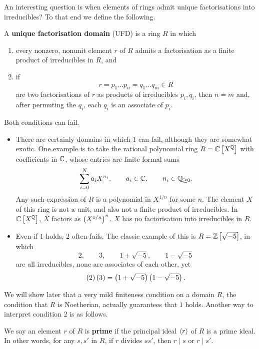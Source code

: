 An interesting question is when elements of rings admit unique factorisations into irreducibles? To that end we define the following.

\begin{definition}
A \textbf{unique factorisation domain} (UFD) is a ring $ R $ in which
\begin{enumerate}
\item every nonzero, nonunit element $ r $ of $ R $ admits a factorisation as a finite product of irreducibles in $ R $, and
\item if
$$ r = p_1 \dots p_n = q_1 \dots q_m \in R $$
are two factorisations of $ r $ as products of irreducibles $ p_i, q_i $, then $ n = m $ and, after permuting the $ q_i $, each $ q_i $ is an associate of $ p_i $.
\end{enumerate}
\end{definition}

Both conditions can fail.

\begin{example*}
\hfill
\begin{itemize}
\item There are certainly domains in which $ 1 $ can fail, although they are somewhat exotic. One example is to take the rational polynomial ring $ R = \mathbb{C}\left[ X^{\mathbb{Q}} \right] $ with coefficients in $ \mathbb{C} $, whose entries are finite formal sums
$$ \sum_{i = 0}^N a_iX^{n_i}, \qquad a_i \in \mathbb{C}, \qquad n_i \in \mathbb{Q}_{\ge 0}. $$
Any such expression of $ R $ is a polynomial in $ X^{1 / n} $ for some $ n $. The element $ X $ of this ring is not a unit, and also not a finite product of irreducibles. In $ \mathbb{C}\left[ X^{\mathbb{Q}} \right] $, $ X $ factors as $ \left( X^{1 / n} \right)^n $. $ X $ has no factorisation into irreducibles in $ R $.
\item Even if $ 1 $ holds, $ 2 $ often fails. The classic example of this is $ R = \mathbb{Z}\left[ \sqrt{-5} \right] $, in which
$$ 2, \qquad 3, \qquad 1 + \sqrt{-5}, \qquad 1 - \sqrt{-5} $$
are all irreducibles, none are associates of each other, yet
$$ \left( 2 \right)\left( 3 \right) = \left( 1 + \sqrt{-5} \right)\left( 1 - \sqrt{-5} \right). $$
\end{itemize}
\end{example*}

\pagebreak

We will show later that a very mild finiteness condition on a domain $ R $, the condition that $ R $ is Noetherian, actually guarantees that $ 1 $ holds. Another way to interpret condition $ 2 $ is as follows.

\begin{definition}
We say an element $ r $ of $ R $ is \textbf{prime} if the principal ideal $ \left\langle r \right\rangle $ of $ R $ is a prime ideal. In other words, for any $ s, s' $ in $ R $, if $ r $ divides $ ss' $, then $ r \mid s $ or $ r \mid s' $.
\end{definition}

